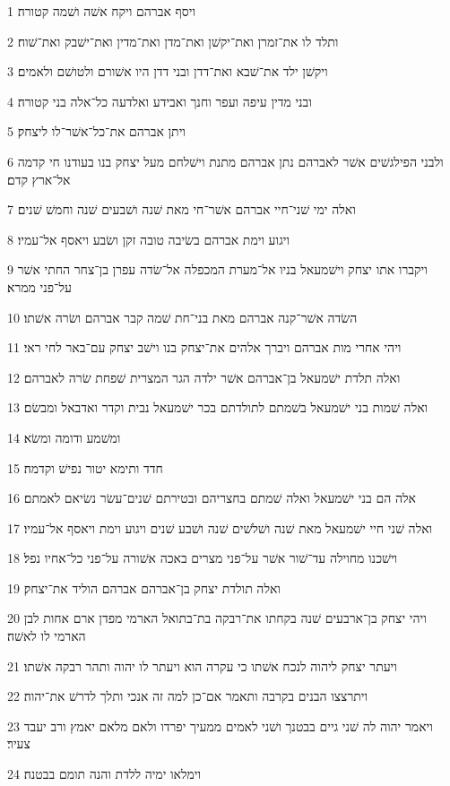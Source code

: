 \par 1 ויסף אברהם ויקח אשׁה ושׁמה קטורה׃
\par 2 ותלד לו את־זמרן ואת־יקשׁן ואת־מדן ואת־מדין ואת־ישׁבק ואת־שׁוח׃
\par 3 ויקשׁן ילד את־שׁבא ואת־דדן ובני דדן היו אשׁורם ולטושׁם ולאמים׃
\par 4 ובני מדין עיפה ועפר וחנך ואבידע ואלדעה כל־אלה בני קטורה׃
\par 5 ויתן אברהם את־כל־אשׁר־לו ליצחק׃
\par 6 ולבני הפילגשׁים אשׁר לאברהם נתן אברהם מתנת וישׁלחם מעל יצחק בנו בעודנו חי קדמה אל־ארץ קדם׃
\par 7 ואלה ימי שׁני־חיי אברהם אשׁר־חי מאת שׁנה ושׁבעים שׁנה וחמשׁ שׁנים׃
\par 8 ויגוע וימת אברהם בשׂיבה טובה זקן ושׂבע ויאסף אל־עמיו׃
\par 9 ויקברו אתו יצחק וישׁמעאל בניו אל־מערת המכפלה אל־שׂדה עפרן בן־צחר החתי אשׁר על־פני ממרא׃
\par 10 השׂדה אשׁר־קנה אברהם מאת בני־חת שׁמה קבר אברהם ושׂרה אשׁתו׃
\par 11 ויהי אחרי מות אברהם ויברך אלהים את־יצחק בנו וישׁב יצחק עם־באר לחי ראי׃
\par 12 ואלה תלדת ישׁמעאל בן־אברהם אשׁר ילדה הגר המצרית שׁפחת שׂרה לאברהם׃
\par 13 ואלה שׁמות בני ישׁמעאל בשׁמתם לתולדתם בכר ישׁמעאל נבית וקדר ואדבאל ומבשׂם׃
\par 14 ומשׁמע ודומה ומשׂא׃
\par 15 חדד ותימא יטור נפישׁ וקדמה׃
\par 16 אלה הם בני ישׁמעאל ואלה שׁמתם בחצריהם ובטירתם שׁנים־עשׂר נשׂיאם לאמתם׃
\par 17 ואלה שׁני חיי ישׁמעאל מאת שׁנה ושׁלשׁים שׁנה ושׁבע שׁנים ויגוע וימת ויאסף אל־עמיו׃
\par 18 וישׁכנו מחוילה עד־שׁור אשׁר על־פני מצרים באכה אשׁורה על־פני כל־אחיו נפל׃
\par 19 ואלה תולדת יצחק בן־אברהם אברהם הוליד את־יצחק׃
\par 20 ויהי יצחק בן־ארבעים שׁנה בקחתו את־רבקה בת־בתואל הארמי מפדן ארם אחות לבן הארמי לו לאשׁה׃
\par 21 ויעתר יצחק ליהוה לנכח אשׁתו כי עקרה הוא ויעתר לו יהוה ותהר רבקה אשׁתו׃
\par 22 ויתרצצו הבנים בקרבה ותאמר אם־כן למה זה אנכי ותלך לדרשׁ את־יהוה׃
\par 23 ויאמר יהוה לה שׁני גיים בבטנך ושׁני לאמים ממעיך יפרדו ולאם מלאם יאמץ ורב יעבד צעיר׃
\par 24 וימלאו ימיה ללדת והנה תומם בבטנה׃
